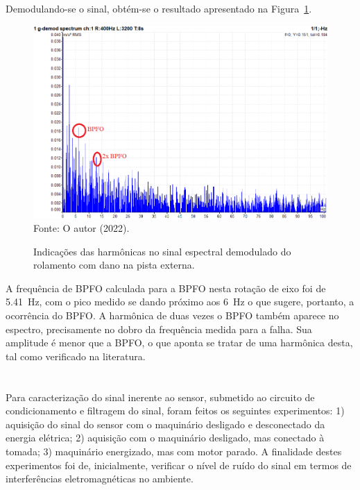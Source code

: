 \documentclass[
	12pt,				
	oneside,			
	a4paper,			
	english,			
	brazil,			
	]{abntex2ppgsi}
\begin{document}
Demodulando-se o sinal, obtém-se o resultado apresentado na Figura~\ref{PISTA_EXTERNA_DEMODULADA_anotada}.
 
\begin{figure}[H]
\centering
\caption {Indicações das harmônicas no sinal espectral demodulado do rolamento com dano na pista externa.}
\includegraphics[width=\textwidth,keepaspectratio]{PISTA_EXTERNA_DEMODULADA_anotada} \\
Fonte: O autor (2022).
\label{PISTA_EXTERNA_DEMODULADA_anotada}
\end{figure} 

A frequência de BPFO calculada para a BPFO nesta rotação de eixo foi de \SI{5.41}{\hertz}, com o pico medido se dando próximo aos \SI{6}{\hertz} o que sugere, portanto, a ocorrência do BPFO. A harmônica de duas vezes o BPFO também aparece no espectro, precisamente no dobro da frequência medida para a falha. Sua amplitude é menor que a BPFO, o que aponta se tratar de uma harmônica desta, tal como verificado na literatura.
 
\newpage
\section{}

Para caracterização do sinal inerente ao sensor, submetido ao circuito de condicionamento e filtragem do sinal, foram feitos os seguintes experimentos: 1) aquisição do sinal do sensor com o maquinário desligado e desconectado da energia elétrica; 2) aquisição com o maquinário desligado, mas conectado à tomada; 3) maquinário energizado, mas com motor parado. A finalidade destes experimentos foi de, inicialmente, verificar o nível de ruído do sinal em termos de interferências eletromagnéticas no ambiente.
\end{document}

